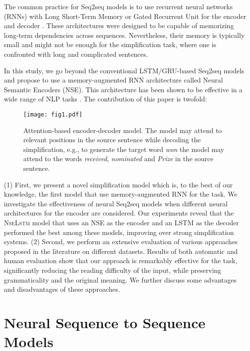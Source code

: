 \documentclass[11pt,a4paper]{article}
\begin{document}
The common practice for Seq2seq models is to use recurrent neural networks (RNNs) with Long Short-Term Memory \cite[LSTM,][]{Hochreiter:97} or Gated Recurrent Unit \cite[GRU,][]{Cho:14} for the encoder and decoder \cite{Nisioi:17,Zhang:17}. These architectures were designed to be capable of memorizing long-term dependencies across sequences. Nevertheless, their memory is typically small and might not be enough for the simplification task, where one is confronted with long and complicated sentences. 

In this study, we go beyond the conventional LSTM/GRU-based Seq2seq models and propose to use a memory-augmented RNN architecture called Neural Semantic Encoders (NSE). This architecture has been shown to be effective in a wide range of NLP tasks \cite{Munkhdalai:17a}. The contribution of this paper is twofold:
\begin{figure}[h!]
\centering
\texttt{[image: fig1.pdf]}
\caption{Attention-based encoder-decoder model. The model may attend to relevant positions in the source sentence while decoding the simplification, e.g., to generate the target word \textit{won} the model may attend to the words \textit{received}, \textit{nominated} and \textit{Prize} in the source sentence.}
\label{fig1}
\vspace*{-3mm}
\end{figure}

(1) First, we present a novel simplification model which is, to the best of our knowledge, the first model that use memory-augmented RNN for the task. We investigate the effectiveness of neural Seq2seq models when different neural architectures for the encoder are considered. Our experiments reveal that the \textsc{NseLstm} model that uses an NSE as the encoder and an LSTM as the decoder performed the best among these models, improving over strong simplification systems. (2) Second, we perform an extensive evaluation of various approaches proposed in the literature on different datasets. Results of both automatic and human evaluation show that our approach is remarkably effective for the task, significantly reducing the reading difficulty of the input, while preserving grammaticality and the original meaning. We further discuss some advantages and disadvantages of these approaches.






\section{Neural Sequence to Sequence Models}
\end{document}
